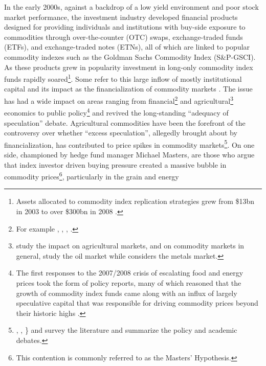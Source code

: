 \documentclass[12pt,]{article}
\let\rmarkdownfootnote\footnote%
\def\footnote{\protect\rmarkdownfootnote}
\begin{document}
In the early 2000s, against a backdrop of a low yield environment and
poor stock market performance, the investment industry developed
financial products designed for providing individuals and institutions
with buy-side exposure to commodities through over-the-counter (OTC)
swaps, exchange-traded funds (ETFs), and exchange-traded notes (ETNs),
all of which are linked to popular commodity indexes such as the Goldman
Sachs Commodity Index (S\&P-GSCI). As these products grew in popularity
investment in long-only commodity index funds rapidly soared\footnote{Assets
  allocated to commodity index replication strategies grew from \$13bn
  in 2003 to over \$300bn in 2008 \citep{masters_accidental_2011}.}.
Some refer to this large inflow of mostly institutional capital and its
impact as the financialization of commodity markets
\citep{domanski_financial_2007}. The issue has had a wide impact on
areas ranging from financial\footnote{For example
  \citet{tang_index_2012}, \citet{singleton_investor_2013},
  \citet{basak_model_2016}, \citet{henderson_new_2015}.} and
agricultural\footnote{\citet{irwin_financialization_2012} study the
  impact on agricultural markets, \citet{irwin_index_2011} and
  \citet{hamilton_effects_2015} on commodity markets in general,
  \citet{buyuksahin_speculators_2014} study the oil market while
  \citet{korniotis_does_2009} considers the metals market.} economics to
public policy\footnote{The first responses to the 2007/2008 crisis of
  escalating food and energy prices took the form of policy reports,
  many of which reasoned that the growth of commodity index funds came
  along with an influx of largely speculative capital that was
  responsible for driving commodity prices beyond their historic highs
  \citep[\citet{unctad_global_2009}, \citet{herman_not_2011},
  \citet{deschutter_food_2010},
  \citet{schumann_hunger_2011}]{senate_excessive_2009}.} and revived the
long-standing ``adequacy of speculation'' debate. Agricultural
commodities have been the forefront of the controversy over whether
``excess speculation'', allegedly brought about by financialization, has
contributed to price spikes in commodity markets\footnote{\citet{irwin_index_2011},
  \citet{rouwenhorst_commodity_2012},
  \citet{cheng_financialization_2014}\} and \citet{bos_bitter_2012}
  survey the literature and summarize the policy and academic debates.}.
On one side, championed by hedge fund manager Michael Masters, are those
who argue that index investor driven buying pressure created a massive
bubble in commodity prices\footnote{This contention is commonly referred
  to as the Masters' Hypothesis.}, particularly in the grain and energy
\end{document}
